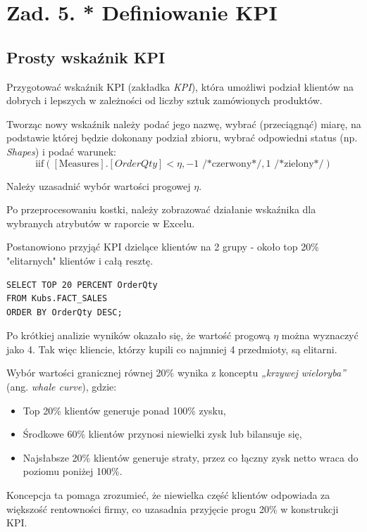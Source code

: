 \documentclass[a4paper,12pt]{article}
\begin{document}
\section{Zad. 5. * Definiowanie KPI}

\subsection{Prosty wskaźnik KPI}

Przygotować wskaźnik KPI (zakładka \textit{KPI}), która umożliwi podział klientów na dobrych i lepszych w zależności od liczby sztuk zamówionych produktów.

Tworząc nowy wskaźnik należy podać jego nazwę, wybrać (przeciągnąć) miarę, na podstawie której będzie dokonany podział zbioru, wybrać odpowiedni status (np. \textit{Shapes}) i podać warunek:
\[
  \text{iif}([\text{Measures}].[OrderQty] < \eta, -1 \text{ /*czerwony*/}, 1 \text{ /*zielony*/})
\]

Należy uzasadnić wybór wartości progowej $\eta$.

Po przeprocesowaniu kostki, należy zobrazować działanie wskaźnika dla wybranych atrybutów w raporcie w Excelu.

Postanowiono przyjąć KPI dzielące klientów na 2 grupy - około top 20\% "elitarnych" klientów i całą resztę.

\begin{lstlisting}[caption={Kwerenda znajdująca dane do wyliczenia KPI}]
SELECT TOP 20 PERCENT OrderQty
FROM Kubs.FACT_SALES
ORDER BY OrderQty DESC;
\end{lstlisting}

Po krótkiej analizie wyników okazało się, że wartość progową $\eta$ można wyznaczyć jako 4. Tak więc kliencie, którzy kupili co najmniej 4 przedmioty, są elitarni.

Wybór wartości granicznej równej 20\% wynika z konceptu \textit{„krzywej wieloryba”} (ang. \textit{whale curve}), gdzie:
\begin{itemize}
  \item Top 20\% klientów generuje ponad 100\% zysku,
  \item Środkowe 60\% klientów przynosi niewielki zysk lub bilansuje się,
  \item Najsłabsze 20\% klientów generuje straty, przez co łączny zysk netto wraca do poziomu poniżej 100\%.
\end{itemize}

Koncepcja ta pomaga zrozumieć, że niewielka część klientów odpowiada za większość rentowności firmy, co uzasadnia przyjęcie progu 20\% w konstrukcji KPI. \cite{whale_curve}
\end{document}
